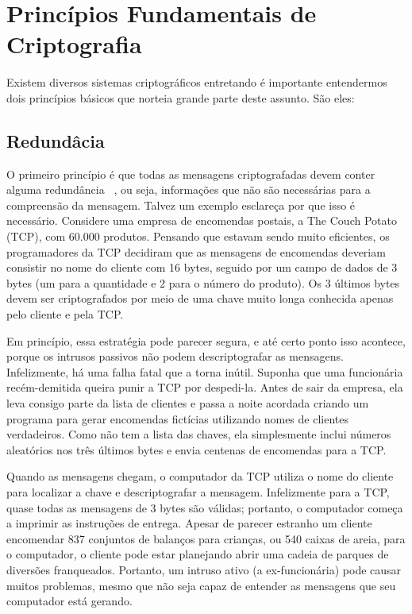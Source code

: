 \section {Princípios Fundamentais de Criptografia}

Existem diversos sistemas criptográficos entretando é importante entendermos dois princípios básicos que norteia grande parte deste assunto. São eles:

\subsection {Redundâcia}

O primeiro princípio é que todas as mensagens criptografadas devem conter alguma redundância ~\cite{tanenbaum}, ou seja, informações que não são necessárias para a compreensão da mensagem. Talvez um exemplo esclareça por que isso é necessário. Considere uma empresa de encomendas postais, a The Couch Potato (TCP), com 60.000 produtos. Pensando que estavam sendo muito eficientes, os
programadores da TCP decidiram que as mensagens de encomendas deveriam consistir no nome
do cliente com 16 bytes, seguido por um campo de dados de 3 bytes (um para a quantidade e 2
para o número do produto). Os 3 últimos bytes devem ser criptografados por meio de uma chave
muito longa conhecida apenas pelo cliente e pela TCP.

Em princípio, essa estratégia pode parecer segura, e até certo ponto isso acontece, porque os
intrusos passivos não podem descriptografar as mensagens. Infelizmente, há uma falha fatal que a
torna inútil. Suponha que uma funcionária recém-demitida queira punir a TCP por despedi-la. Antes
de sair da empresa, ela leva consigo parte da lista de clientes e passa a noite acordada criando um
programa para gerar encomendas fictícias utilizando nomes de clientes verdadeiros. Como não tem
a lista das chaves, ela simplesmente inclui números aleatórios nos três últimos bytes e envia
centenas de encomendas para a TCP.

Quando as mensagens chegam, o computador da TCP utiliza o nome do cliente para localizar a
chave e descriptografar a mensagem. Infelizmente para a TCP, quase todas as mensagens de 3
bytes são válidas; portanto, o computador começa a imprimir as instruções de entrega. Apesar de
parecer estranho um cliente encomendar 837 conjuntos de balanços para crianças, ou 540 caixas
de areia, para o computador, o cliente pode estar planejando abrir uma cadeia de parques de
diversões franqueados. Portanto, um intruso ativo (a ex-funcionária) pode causar muitos
problemas, mesmo que não seja capaz de entender as mensagens que seu computador está
gerando.


